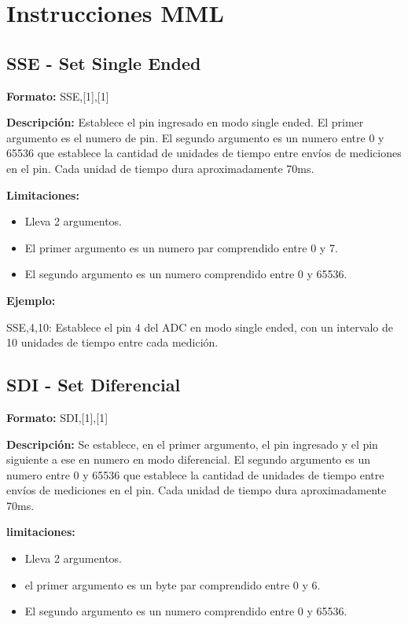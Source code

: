 \section{Instrucciones MML}\label{ap:instrucciones}

\subsection{SSE - Set Single Ended} %
\label{sub:sse_set_single_ended}


\textbf{Formato:} SSE,[1],[1]

\textbf{Descripci\'on:}
Establece el pin ingresado en modo single ended. El primer argumento es el numero de pin. El segundo argumento es un numero entre 0 y 65536 que establece la cantidad de unidades de tiempo entre env\'ios de mediciones en el pin. Cada unidad de tiempo dura aproximadamente 70ms.

\textbf{Limitaciones:}
\begin{itemize}
  \item Lleva 2 argumentos.
  \item El primer argumento es un numero par comprendido entre 0 y 7.
  \item El segundo argumento es un numero comprendido entre 0 y 65536.
\end{itemize}

\textbf{Ejemplo:}

SSE,4,10: Establece el pin 4 del ADC en modo single ended, con un intervalo de 10 unidades de tiempo entre cada medici\'on.


\subsection{SDI - Set Diferencial} %
\label{sub:sdi_set_diferencial}


\textbf{Formato:} SDI,[1],[1]

\textbf{Descripci\'on:}
Se establece, en el primer argumento, el pin ingresado y el pin siguiente a ese en numero en modo diferencial. El segundo argumento es un numero entre 0 y 65536 que establece la cantidad de unidades de tiempo entre env\'ios de mediciones en el pin. Cada unidad de tiempo dura aproximadamente 70ms.

\textbf{limitaciones:}
\begin{itemize}
  \item Lleva 2 argumentos.
  \item el primer argumento es un byte par comprendido entre 0 y 6.
  \item El segundo argumento es un numero comprendido entre 0 y 65536.
\end{itemize}

